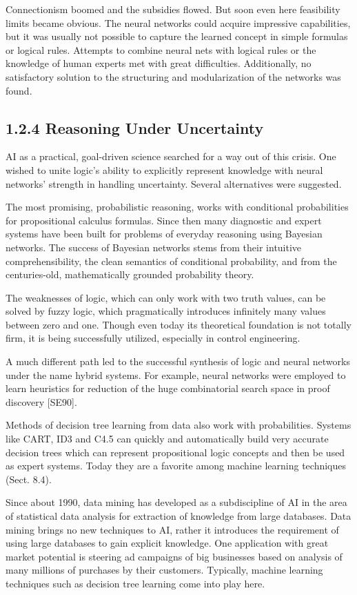 \documentclass[10pt]{book}
\begin{document}
Connectionism boomed and the subsidies flowed. But soon even here feasibility limits became obvious. The neural networks could acquire impressive capabilities, but it was usually not possible to capture the learned concept in simple formulas or logical rules. Attempts to combine neural nets with logical rules or the knowledge of human experts met with great difficulties. Additionally, no satisfactory solution to the structuring and modularization of the networks was found.

\subsection*{1.2.4 Reasoning Under Uncertainty}
AI as a practical, goal-driven science searched for a way out of this crisis. One wished to unite logic's ability to explicitly represent knowledge with neural networks' strength in handling uncertainty. Several alternatives were suggested.

The most promising, probabilistic reasoning, works with conditional probabilities for propositional calculus formulas. Since then many diagnostic and expert systems have been built for problems of everyday reasoning using Bayesian\\
networks. The success of Bayesian networks stems from their intuitive comprehensibility, the clean semantics of conditional probability, and from the centuries-old, mathematically grounded probability theory.


The weaknesses of logic, which can only work with two truth values, can be solved by fuzzy logic, which pragmatically introduces infinitely many values between zero and one. Though even today its theoretical foundation is not totally firm, it is being successfully utilized, especially in control engineering.

A much different path led to the successful synthesis of logic and neural networks under the name hybrid systems. For example, neural networks were employed to learn heuristics for reduction of the huge combinatorial search space in proof discovery [SE90].

Methods of decision tree learning from data also work with probabilities. Systems like CART, ID3 and C4.5 can quickly and automatically build very accurate decision trees which can represent propositional logic concepts and then be used as expert systems. Today they are a favorite among machine learning techniques (Sect. 8.4).

Since about 1990, data mining has developed as a subdiscipline of AI in the area of statistical data analysis for extraction of knowledge from large databases. Data mining brings no new techniques to AI, rather it introduces the requirement of using large databases to gain explicit knowledge. One application with great market potential is steering ad campaigns of big businesses based on analysis of many millions of purchases by their customers. Typically, machine learning techniques such as decision tree learning come into play here.
\end{document}
